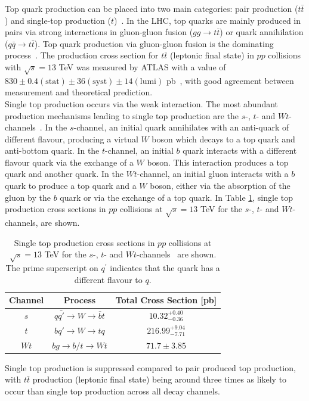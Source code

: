 Top quark production can be placed into two main categories: pair production ($t\bar{t}$) and single-top production ($t$)~\cite{dasilva2016quark}. In the LHC, top quarks are mainly produced in pairs via strong interactions in gluon-gluon fusion ($gg\rightarrow t\bar{t}$) or quark annihilation ($q\bar{q}\rightarrow t\bar{t}$). Top quark production via gluon-gluon fusion is the dominating process~\cite{Ball_2015}. The production cross section for $t\bar{t}$ (leptonic final state) in $pp$ collisions with $\sqrt{s} = 13$ TeV was measured by ATLAS with a value of $830 \pm 0.4 (\text{stat}) \pm 36 (\text{syst}) \pm 14 (\text{lumi})$ pb~\cite{ATLAS-tt-crossSection-2020}, with good agreement between measurement and theoretical prediction.\\

\noindent
Single top production occurs via the weak interaction. The most abundant production mechanisms leading to single top production are the $s$-, $t$- and $Wt$- channels~\cite{pdg}. In the $s$-channel, an initial quark annihilates with an anti-quark of different flavour, producing a virtual $W$ boson which decays to a top quark and anti-bottom quark. In the $t$-channel, an initial $b$ quark interacts with a different flavour quark via the exchange of a $W$ boson. This interaction produces a top quark and another quark. In the $Wt$-channel, an initial gluon interacts with a $b$ quark to produce a top quark and a $W$ boson, either via the absorption of the gluon by the $b$ quark or via the exchange of a top quark. In Table \ref{tab:single-top-crossSection}, single top production cross sections in $pp$ collisions at $\sqrt{s}=13$ TeV for the $s$-, $t$- and $Wt$-channels, are shown.


\begin{table}[h!]
\def\arraystretch{1.5}%
\begin{tabular}{c|c|c}
\hline
Channel & Process & Total Cross Section [pb] \\ \hline
$s$& $q\bar{q'}\rightarrow   W \rightarrow \bar{b}t$& $10.32^{+0.40}_{-0.36}$  \\
$t$ & $bq'\rightarrow W \rightarrow tq$ &  $216.99^{+9.04}_{-7.71}$\\
$Wt$& $bg \rightarrow  b/t \rightarrow Wt$ &  $71.7\pm 3.85$\\ \hline
\end{tabular}
\centering
\caption{Single top production cross sections in $pp$ collisions at $\sqrt{s}=13$ TeV for the $s$-, $t$- and $Wt$-channels~\cite{summaryPlots} are shown. The prime superscript on $q^{'}$ indicates that the quark has a different flavour to $q$. }
\label{tab:single-top-crossSection}
\end{table}
\noindent
Single top production is suppressed compared to pair produced top production, with $t\bar{t}$ production (leptonic final state) being around three times as likely to occur than single top production across all decay channels.


